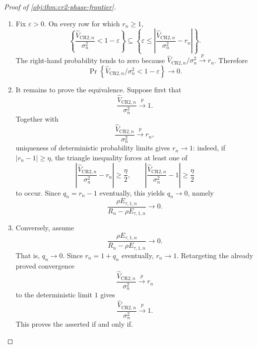 \documentclass[11pt]{article}
\begin{document}
\begin{proof}[Proof of \cref{obj:thm:cr2-phase-frontier}]
\begin{enumerate}
\item Fix \(\varepsilon>0\). On every row for which \(r_n\ge1\),
\[
\left\{
\frac{\widehat V_{\mathrm{CR2},n}}{\sigma_n^2}<1-\varepsilon
\right\}
\subseteq
\left\{
\varepsilon\le
\left|
\frac{\widehat V_{\mathrm{CR2},n}}{\sigma_n^2}-r_n
\right|
\right\}.
\]
The right-hand probability tends to zero because
\(\widehat V_{\mathrm{CR2},n}/\sigma_n^2\xrightarrow{p}r_n\). Therefore
\[
\Pr\!\left\{
\widehat V_{\mathrm{CR2},n}/\sigma_n^2<1-\varepsilon
\right\}\to0 .
\]

\item It remains to prove the equivalence. Suppose first that
\[
\frac{\widehat V_{\mathrm{CR2},n}}{\sigma_n^2}\xrightarrow{p}1 .
\]
Together with
\[
\frac{\widehat V_{\mathrm{CR2},n}}{\sigma_n^2}\xrightarrow{p}r_n,
\]
uniqueness of deterministic probability limits gives \(r_n\to1\): indeed, if \(|r_n-1|\ge\eta\), the triangle inequality forces at least one of
\[
\left|
\frac{\widehat V_{\mathrm{CR2},n}}{\sigma_n^2}-r_n
\right|\ge\frac{\eta}{2},
\qquad
\left|
\frac{\widehat V_{\mathrm{CR2},n}}{\sigma_n^2}-1
\right|\ge\frac{\eta}{2}
\]
to occur. Since \(q_n=r_n-1\) eventually, this yields \(q_n\to0\), namely
\[
\frac{\rho E_{\tau,1,n}}{R_n-\rho E_{\tau,1,n}}\to0 .
\]

\item Conversely, assume
\[
\frac{\rho E_{\tau,1,n}}{R_n-\rho E_{\tau,1,n}}\to0 .
\]
That is, \(q_n\to0\). Since \(r_n=1+q_n\) eventually, \(r_n\to1\). Retargeting the already proved convergence
\[
\frac{\widehat V_{\mathrm{CR2},n}}{\sigma_n^2}\xrightarrow{p}r_n
\]
to the deterministic limit \(1\) gives
\[
\frac{\widehat V_{\mathrm{CR2},n}}{\sigma_n^2}\xrightarrow{p}1 .
\]
This proves the asserted if and only if. %
\end{enumerate}
\end{proof}
\end{document}
